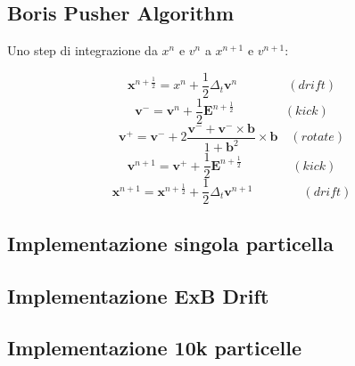 \newpage
{}


\begin{appendices}
\subsection{Boris Pusher Algorithm}\label{boris}
Uno step di integrazione da $x^n$ e $ v^{n} $ a $x^{n+1}$ e $v^{n+1}$:

$$\mathbf{x}^{n+\frac{1}{2}} = x^{n} + \frac{1}{2}\Delta_t \mathbf{v}^n  \qquad \qquad (drift)$$
$$\mathbf{v}^- = \mathbf{v}^n + \frac{1}{2}\mathbf{E}^{n + \frac{1}{2}}\qquad \qquad (kick)$$
$$\mathbf{v}^+ = \mathbf{v}^- + 2\frac{\mathbf{v}^- + \mathbf{v}^- \times \mathbf{b}}{1 + \mathbf{b}^2} \times  \mathbf{b}\quad  (rotate)$$
$$ \mathbf{v}^{n+1} = \mathbf{v}^+ + \frac{1}{2} \mathbf{E}^{n + \frac{1}{2}}\qquad \qquad (kick)$$
$$ \mathbf{x}^{n+1} = \mathbf{x}^{n+\frac{1}{2}} + \frac{1}{2}\Delta_t \mathbf{v}^{n+1}\qquad \qquad (drift)$$


\subsection{Implementazione singola particella}



\subsection{Implementazione ExB Drift}



\subsection{Implementazione 10k particelle}



\end{appendices}